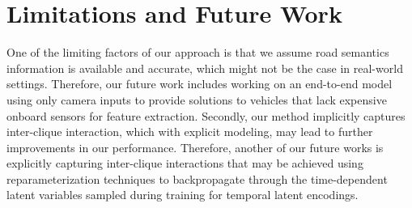 \documentclass[letterpaper, 10 pt, conference]{ieeeconf}  %
\begin{document}
\section{Limitations and Future Work}
One of the limiting factors of our approach is that we assume road semantics information is available and accurate, which might not be the case in real-world settings. Therefore, our future work includes working on an end-to-end model using only camera inputs to provide solutions to vehicles that lack expensive onboard sensors for feature extraction. Secondly, our method implicitly captures inter-clique interaction, which with explicit modeling, may lead to further improvements in our performance. Therefore, another of our future works is explicitly capturing inter-clique interactions that may be achieved using reparameterization techniques to backpropagate through the time-dependent latent variables sampled during training for temporal latent encodings. %


\end{document}
